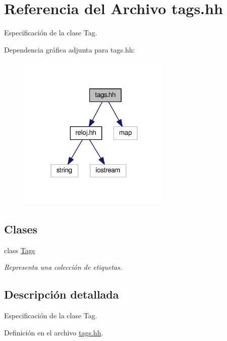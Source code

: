 \hypertarget{tags_8hh}{\section{Referencia del Archivo tags.\-hh}
\label{tags_8hh}
}


Especificación de la clase Tag.  


Dependencia gráfica adjunta para tags.\-hh\-:\nopagebreak
\begin{figure}[H]
\begin{center}
\leavevmode
\includegraphics[width=208pt]{tags_8hh__incl}
\end{center}
\end{figure}
\subsection*{Clases}
\begin{DoxyCompactItemize}
\item 
class \hyperlink{class_tags}{Tags}
\begin{DoxyCompactList}\small\item\em Representa una colección de etiquetas. \end{DoxyCompactList}\end{DoxyCompactItemize}


\subsection{Descripción detallada}
Especificación de la clase Tag. 

Definición en el archivo \hyperlink{tags_8hh_source}{tags.\-hh}.


